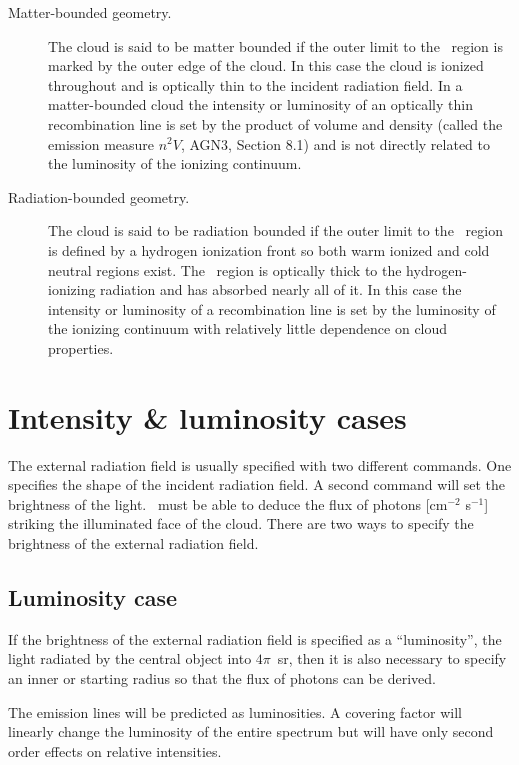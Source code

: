 \begin{description}
\item[Matter-bounded geometry.]
The cloud is said to be matter bounded if
the outer limit to the \hplus\ region is marked by the
outer edge of the cloud.
In this case the cloud is ionized throughout
and is optically thin to the
incident radiation field.
In a matter-bounded cloud the intensity or luminosity
of an optically thin recombination line is set by
the product of volume and density
(called the emission measure $n^2V$, AGN3, Section 8.1) and is
not directly related to the luminosity of the ionizing continuum.

\item[Radiation-bounded geometry.]
The cloud is said to be radiation bounded
if the outer limit to the \hplus\ region is defined by
a hydrogen ionization
front so both warm ionized and cold neutral regions exist.
The \hplus\ region
is optically thick to the hydrogen-ionizing radiation
and has absorbed nearly all of it.
In this case the intensity or luminosity of a recombination
line is set by the luminosity of the ionizing continuum with
relatively little dependence on cloud properties.
\end{description}

\section{Intensity \& luminosity cases }
\label{sec:IntensityLuminosityCases}

The external radiation field is usually specified with
two different commands.
One specifies the shape of the incident radiation field.
A second command will set the brightness of the light.
\Cloudy\ must be able to deduce the flux of photons
[cm$^{-2}$ s$^{-1}$]
striking the illuminated face of the cloud.
There are two ways to specify the brightness of the external radiation field.

\subsection{Luminosity case}

If the brightness of the external radiation field is specified as a ``luminosity'',
the light radiated by the central object into $4\pi$~sr, then it is also
necessary to specify an inner or starting radius so that the flux of
photons can be derived.

The emission lines will be predicted as luminosities.
A covering factor will linearly change the luminosity of the entire spectrum
but will have only second order effects on relative intensities.

